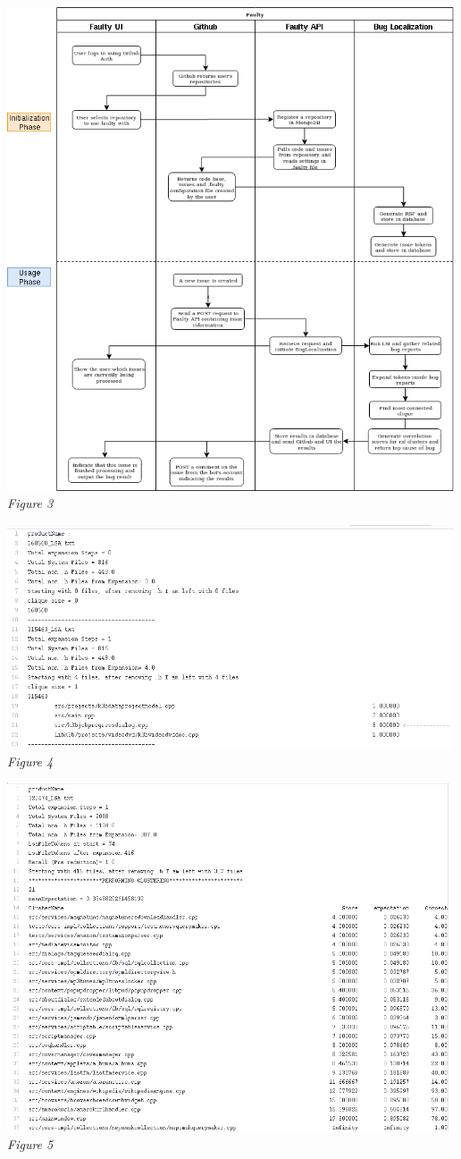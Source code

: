 \documentclass[12pt]{article}
\begin{document}
\includegraphics[width=500px]{../images/Flow} \emph{Figure 3}

\includegraphics[width=500px]{../images/BLSimple} \emph{Figure 4}

\includegraphics[width=500px]{../images/BLComplex} \emph{Figure 5}
\end{document}
